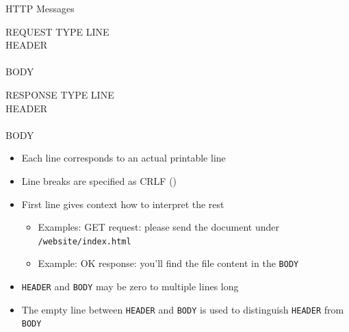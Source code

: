 \begin{frame}{HTTP Messages}
%
\begin{tcbraster}[raster columns=2,
                  raster equal height,
                  nobeforeafter,
                  raster column skip=0.1cm]
\begin{codebox}
\ttfamily
REQUEST TYPE LINE \\
HEADER \\
\\
BODY
\end{codebox}
%
\begin{codebox}
\ttfamily
RESPONSE TYPE LINE \\
HEADER \\
\\
BODY
\end{codebox}
\end{tcbraster}
%
\begin{itemize}
\item Each line corresponds to an actual printable line
\item Line breaks are specified as CRLF ()
\item First line gives context how to interpret the rest
	\begin{itemize}
	\item Examples: GET request: please send the document under \texttt{/website/index.html}
	\item Example: OK response: you'll find the file content in the \texttt{BODY}
	\end{itemize}
\item \texttt{HEADER} and \texttt{BODY} may be zero to multiple lines long
\item The empty line between \texttt{HEADER} and \texttt{BODY} is used to distinguish \texttt{HEADER} from \texttt{BODY}
\end{itemize}
%
\end{frame}


